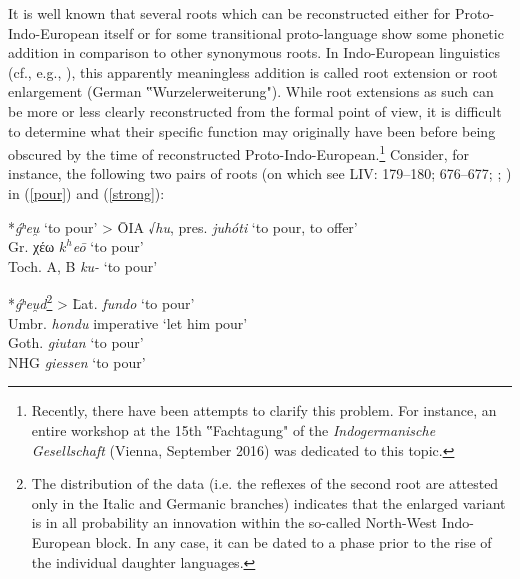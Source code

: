 \documentclass[output=paper,colorlinks,citecolor=brown]{langscibook}
\begin{document}
It is well known that several roots which can be reconstructed either for Proto-Indo-European itself or for some transitional proto-language show some phonetic addition in comparison to other synonymous roots. In Indo-European linguistics (cf., e.g., \citealt[100--101]{Szemerényi1996}), this apparently meaningless addition is called root extension or root enlargement (German ‟Wurzelerweiterung"). While root extensions as such can be more or less clearly reconstructed from the formal point of view, it is difficult to determine what their specific function may originally have been before being obscured by the time of reconstructed Proto-Indo-European.\footnote{Recently, there have been attempts to clarify this problem. For instance, an entire workshop at the 15th ‟Fachtagung" of the \textit{Indogermanische Gesellschaft} (Vienna, September 2016) was dedicated to this topic.}                     Consider, for instance, the following two pairs of roots (on which see LIV: 179–180; 676–677; \citealt[14--15]{Hackstein2002b}; \citealt[38]{Balles2006}) in (\ref{pour}) and (\ref{strong}):

\ea\label{pour}
\begin{tabbing}
*\textit{ǵʰeu̯} ‘to pour’ >    \= OIA √\textit{hu}, pres. \textit{juhóti} ‘to pour, to offer’ \\
\> Gr. χέω \textit{$k^h$eō} ‘to pour’ \\
\> Toch. A, B \textit{ku-} ‘to pour’
\end{tabbing}

\begin{tabbing}
*\textit{ǵʰeu̯d}\footnote{The distribution of the data (i.e. the reflexes of the second root are attested only in the Italic and Germanic branches) indicates that the enlarged variant is in all probability an innovation within the so-called North-West Indo-European block. In any case, it can be dated to a phase prior to the rise of the individual daughter languages.}          >	\= Lat. \textit{fundo} ‘to pour’ \\
\> Umbr. \textit{hondu} imperative ‘let him pour’ \\
\> Goth. \textit{giutan} ‘to pour’ \\
\> NHG \textit{giessen} ‘to pour’
\end{tabbing}
\z
\end{document}
